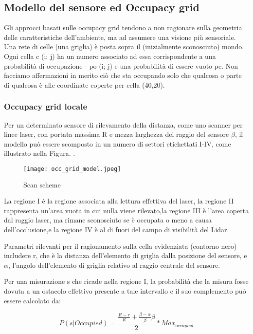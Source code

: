 \subsection{Modello del sensore ed Occupacy grid}

Gli approcci basati sulle occupacy grid tendono a non ragionare sulla geometria delle caratteristiche  dell'ambiente, ma ad assumere una visione più sensoriale. Una rete di celle (una griglia) è posta sopra il
(inizialmente sconosciuto) mondo. Ogni cella c (i; j) ha un numero associato ad essa corrispondente
a una probabilità di occupazione - po (i; j) e una probabilità di essere vuoto pe. Non facciamo affermazioni in merito ciò che sta occupando solo che qualcosa o parte di qualcosa è alle coordinate coperte
per cella (40,20).

\subsubsection{Occupacy grid locale}
Per un determinato sensore di rilevamento della distanza, come uno scanner per linee laser, con portata massima R e mezza larghezza del raggio del sensore $\beta$, il modello può essere scomposto in un numero di settori etichettati I-IV, come illustrato nella Figura. .

\begin{figure}
  \texttt{[image: occ\_grid\_model.jpeg]}
  \caption{Scan scheme}
  \label{fig:scan scheme}
\end{figure}

La regione I è la regione associata alla lettura effettiva del laser, la regione II rappresenta un'area vuota in cui nulla viene rilevato,la regione III è l'area coperta dal raggio laser, ma rimane sconosciuto se è occupata o meno a causa dell'occlusione,e la regione IV è al di fuori del campo di visibilità del Lidar.

Parametri rilevanti per il ragionamento sulla cella evidenziata (contorno nero) includere r, che è la distanza dell'elemento di griglia dalla posizione del sensore, e $\alpha$, l'angolo dell'elemento di griglia relativo al raggio centrale del sensore.

Per una misurazione s che ricade nella regione I, la probabilità che la misura fosse dovuta a un
ostacolo effettivo presente a tale intervallo e il suo complemento può essere calcolato da:

\begin{equation}	
\label{eq:lidargrid}
P(s|Occupied) = \frac{\frac{R-r}{R} + \frac{ \beta- \alpha}{\beta} \beta}{2}*Max_{occupied}
\end{equation}

